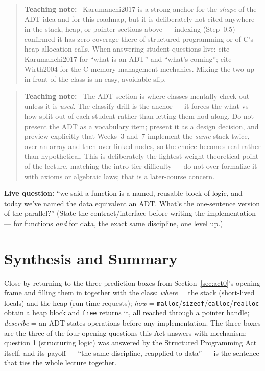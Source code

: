 \documentclass[11pt]{article}
\newenvironment{teachingaside}{\begin{quote}\small\color{primary-gold}\textbf{Teaching note:}\ }{\end{quote}}
\begin{document}
\begin{teachingaside}
Karumanchi2017 is a strong anchor for the \emph{shape} of the ADT idea and for this roadmap, but it is deliberately not cited anywhere in the stack, heap, or pointer sections above --- indexing (Step~0.5) confirmed it has zero coverage there of structured programming or of C's heap-allocation calls. When answering student questions live: cite Karumanchi2017 for ``what is an ADT'' and ``what's coming''; cite Wirth2004 for the C memory-management mechanics. Mixing the two up in front of the class is an easy, avoidable slip.
\end{teachingaside}

\begin{teachingaside}
The ADT section is where classes mentally check out unless it is \emph{used}. The classify drill is the anchor --- it forces the what-vs-how split out of each student rather than letting them nod along. Do not present the ADT as a vocabulary item; present it as a design decision, and preview explicitly that Weeks~3 and~7 implement the \emph{same} stack twice, over an array and then over linked nodes, so the choice becomes real rather than hypothetical. This is deliberately the lightest-weight theoretical point of the lecture, matching the intro-tier difficulty --- do not over-formalize it with axioms or algebraic laws; that is a later-course concern.
\end{teachingaside}

\textbf{Live question:} ``we said a function is a named, reusable block of logic, and today we've named the data equivalent an ADT. What's the one-sentence version of the parallel?'' (State the contract/interface before writing the implementation --- for functions \emph{and} for data, the exact same discipline, one level up.)

\section{Synthesis and Summary}

Close by returning to the three prediction boxes from Section~\ref{sec:act0}'s opening frame and filling them in together with the class: \emph{where} = the stack (short-lived locals) and the heap (run-time requests); \emph{how} = \texttt{malloc}/\texttt{sizeof}/\texttt{calloc}/\texttt{realloc} obtain a heap block and \texttt{free} returns it, all reached through a pointer handle; \emph{describe} = an ADT states operations before any implementation. The three boxes are the three of the four opening questions this Act answers with mechanism; question 1 (structuring logic) was answered by the Structured Programming Act itself, and its payoff --- ``the same discipline, reapplied to data'' --- is the sentence that ties the whole lecture together.
\end{document}
